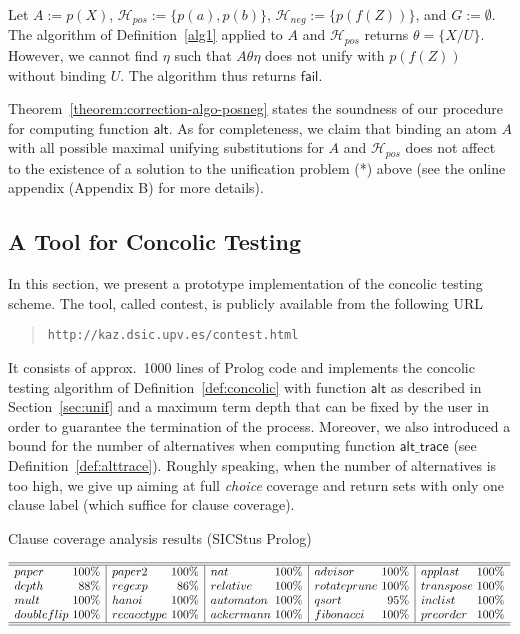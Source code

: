 \documentclass[fleqn]{tlp}
\newcommand{\alt}{\mathsf{alt}}
\newcommand{\alttrace}{\mathsf{alt\_trace}}
\newcommand{\fail}{\mathsf{fail}}
\newcommand{\Hpos}{\mathcal{H}_{\mathit{pos}}}
\newcommand{\Hneg}{\mathcal{H}_{\mathit{neg}}}
\begin{document}
\begin{example}
  Let $A:=p(X)$, $\Hpos:=\{p(a),p(b)\}$, 
  $\Hneg:=\{p(f(Z))\}$, and $G:=\emptyset$. 
  The algorithm of Definition~\ref{alg1}
  applied to $A$ and $\Hpos$ 
  returns $\theta=\{X/U\}$. 
  However, we cannot find $\eta$ such that $A\theta\eta$ does not
  unify with $p(f(Z))$ without binding $U$. 
  The algorithm thus returns $\fail$.  
\end{example}
Theorem~\ref{theorem:correction-algo-posneg} states the soundness of our
procedure for computing function $\alt$.
As for completeness, we claim that binding an atom $A$ with all
possible maximal unifying substitutions for $A$ and $\Hpos$ does not
affect to the existence of a solution to the unification problem (*)
above
(see the online appendix (Appendix B) for more details).


\subsection{A Tool for Concolic Testing} \label{tool}

In this section, we present a prototype implementation of the
concolic testing scheme. The tool, called \textsf{contest}, is
publicly available from the following URL
\begin{quote}
  \texttt{http://kaz.dsic.upv.es/contest.html}
\end{quote}
It consists of approx.\ 1000 lines of Prolog code and implements the
concolic testing algorithm of Definition~\ref{def:concolic} with
function $\alt$ as described in Section~\ref{sec:unif} and a maximum
term depth that can be fixed by the user in order to guarantee the
termination of the process. 
Moreover, we also introduced a bound for the number of alternatives
when computing function $\alttrace$ (see
Definition~\ref{def:alttrace}). Roughly speaking, when the number of
alternatives is too high, we give up aiming at full \emph{choice}
coverage and return sets with only one clause label (which suffice for
clause coverage).

\begin{table}[t]
  \caption{Clause coverage analysis results (SICStus Prolog)}   \label{table:coverage}
  \centering
  \footnotesize
  $
  \begin{array}{l@{~}r|l@{~}r|l@{~}r|l@{~}r|l@{~}r}
    \hline\hline
paper & 100\% &
   paper2 & 100\% &
   nat & 100\% &
   advisor & 100\% &
   applast & 100\% \\ depth & 88\% &
   regexp & 86\% &
   relative & 100\% &
   rotateprune & 100\% &
   transpose & 100\% \\ mult & 100\% &
   hanoi & 100\% &
   automaton & 100\% &
   qsort & 95\% &
   inclist & 100\% \\ doubleflip & 100\% &
   recacctype & 100\% &
   ackermann & 100\% &
   fibonacci & 100\% &
   preorder & 100\% \\\hline\hline
  \end{array}
  $
\end{table}
\end{document}
